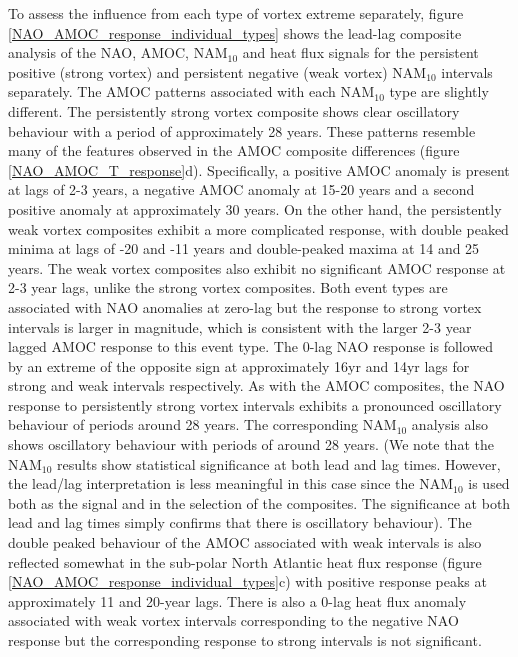 To assess the influence from each type of vortex extreme separately, figure \ref{NAO_AMOC_response_individual_types} shows the lead-lag composite analysis of the NAO, AMOC, NAM$_{10}$ and heat flux signals for the persistent positive (strong vortex) and persistent negative (weak vortex) NAM$_{10}$ intervals separately. The AMOC patterns associated with each NAM$_{10}$ type are slightly different. The persistently strong vortex composite shows clear oscillatory behaviour with a period of approximately 28 years. These patterns resemble many of the features observed in the AMOC composite differences (figure \ref{NAO_AMOC_T_response}d). Specifically, a positive AMOC anomaly is present at lags of 2-3 years, a negative AMOC anomaly at 15-20 years and a second positive anomaly at approximately 30 years. On the other hand, the persistently weak vortex composites exhibit a more complicated response, with double peaked minima at lags of -20 and -11 years and double-peaked maxima at 14 and 25 years. The weak vortex composites also exhibit no significant AMOC response at 2-3 year lags, unlike the strong vortex composites. Both event types are associated with NAO anomalies at zero-lag but the response to strong vortex intervals is larger in magnitude, which is consistent with the larger 2-3 year lagged AMOC response to this event type. The 0-lag NAO response is followed by an extreme of the opposite sign at approximately 16yr and 14yr lags for strong and weak intervals respectively. As with the AMOC composites, the NAO response to persistently strong vortex intervals exhibits a pronounced oscillatory behaviour of periods around 28 years. The corresponding NAM$_{10}$ analysis also shows oscillatory behaviour with periods of around 28 years. (We note that the NAM$_{10}$ results  show statistical significance  at both lead and lag times. However, the lead/lag interpretation is less meaningful in this case since the NAM$_{10}$ is used both as the signal and in the selection of the composites. The significance at both lead and lag times simply confirms that there is oscillatory behaviour). The double peaked behaviour of the AMOC associated with weak intervals is also reflected somewhat in the sub-polar North Atlantic heat flux response (figure \ref{NAO_AMOC_response_individual_types}c) with positive response peaks at approximately 11 and 20-year lags. There is also a 0-lag heat flux anomaly associated with weak vortex intervals corresponding to the negative NAO response but the corresponding response to strong intervals is not significant. 

